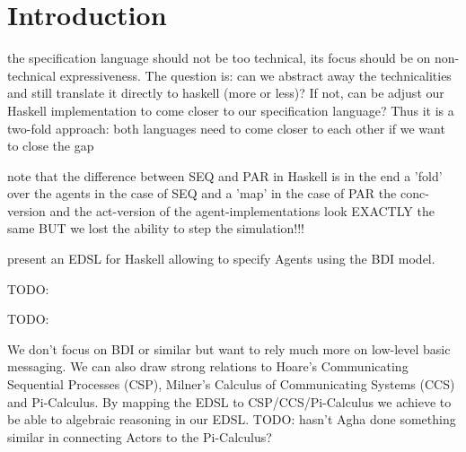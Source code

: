 \section{Introduction}
 the specification language should not be too technical, its focus should be on non-technical expressiveness. The question is: can we abstract away the technicalities and still translate it directly to haskell (more or less)? If not, can be adjust our Haskell implementation to come closer to our specification language? Thus it is a two-fold approach: both languages need to come closer to each other if we want to close the gap
 
 note that the difference between SEQ and PAR in Haskell is in the end a 'fold' over the agents in the case of SEQ and a 'map' in the case of PAR
 the conc-version and the act-version of the agent-implementations look EXACTLY the same	 BUT we lost the ability to step the simulation!!!

\cite{sulzmann_specifying_2007} present an EDSL for Haskell allowing to specify Agents using the BDI model.

TODO: \cite{schneider_towards_2012}

TODO: \cite{vendrov_frabjous:_2014}

We don't focus on BDI or similar but want to rely much more on low-level basic messaging. We can also draw strong relations to Hoare's Communicating Sequential Processes (CSP), Milner's Calculus of Communicating Systems (CCS) and Pi-Calculus. By mapping the EDSL to CSP/CCS/Pi-Calculus we achieve to be able to algebraic reasoning in our EDSL. TODO: hasn't Agha done something similar in connecting Actors to the Pi-Calculus?
